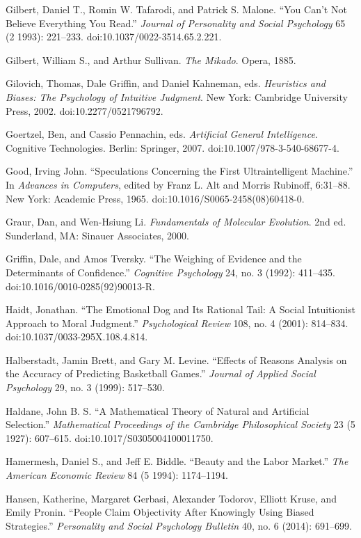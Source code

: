 \documentclass[letterpaper]{book}
\begin{document}
{
 Gilbert, Daniel T., Romin W. Tafarodi, and Patrick S. Malone.
``You Can't Not Believe Everything You
Read.'' \textit{Journal of Personality and Social
Psychology} 65 (2 1993): 221--233. doi:10.1037/0022-3514.65.2.221.}

{
 Gilbert, William S., and Arthur Sullivan. \textit{The Mikado}.
Opera, 1885.}

{
 Gilovich, Thomas, Dale Griffin, and Daniel Kahneman, eds.
\textit{Heuristics and Biases: The Psychology of Intuitive Judgment}.
New York: Cambridge University Press, 2002. doi:10.2277/0521796792.}

{
 Goertzel, Ben, and Cassio Pennachin, eds. \textit{Artificial
General Intelligence}. Cognitive Technologies. Berlin: Springer, 2007.
doi:10.1007/978-3-540-68677-4.}

{
 Good, Irving John. ``Speculations Concerning the
First Ultraintelligent Machine.'' In \textit{Advances
in Computers}, edited by Franz L. Alt and Morris Rubinoff, 6:31--88.
New York: Academic Press, 1965. doi:10.1016/S0065-2458(08)60418-0.}

{
 Graur, Dan, and Wen-Hsiung Li. \textit{Fundamentals of Molecular
Evolution}. 2nd ed. Sunderland, MA: Sinauer Associates, 2000.}

{
 Griffin, Dale, and Amos Tversky. ``The Weighing
of Evidence and the Determinants of Confidence.''
\textit{Cognitive Psychology} 24, no. 3 (1992): 411--435.
doi:10.1016/0010-0285(92)90013-R.}

{
 Haidt, Jonathan. ``The Emotional Dog and Its
Rational Tail: A Social Intuitionist Approach to Moral
Judgment.'' \textit{Psychological Review} 108, no. 4
(2001): 814--834. doi:10.1037/0033-295X.108.4.814.}

{
 Halberstadt, Jamin Brett, and Gary M. Levine.
``Effects of Reasons Analysis on the Accuracy of
Predicting Basketball Games.'' \textit{Journal of
Applied Social Psychology} 29, no. 3 (1999): 517--530.}

{
 Haldane, John B. S. ``A Mathematical Theory of
Natural and Artificial Selection.''
\textit{Mathematical Proceedings of the Cambridge Philosophical
Society} 23 (5 1927): 607--615. doi:10.1017/S0305004100011750.}

{
 Hamermesh, Daniel S., and Jeff E. Biddle.
``Beauty and the Labor Market.''
\textit{The American Economic Review} 84 (5 1994): 1174--1194.}

{
 Hansen, Katherine, Margaret Gerbasi, Alexander Todorov, Elliott
Kruse, and Emily Pronin. ``People Claim Objectivity
After Knowingly Using Biased Strategies.''
\textit{Personality and Social Psychology Bulletin} 40, no. 6 (2014):
691--699.}
\end{document}
